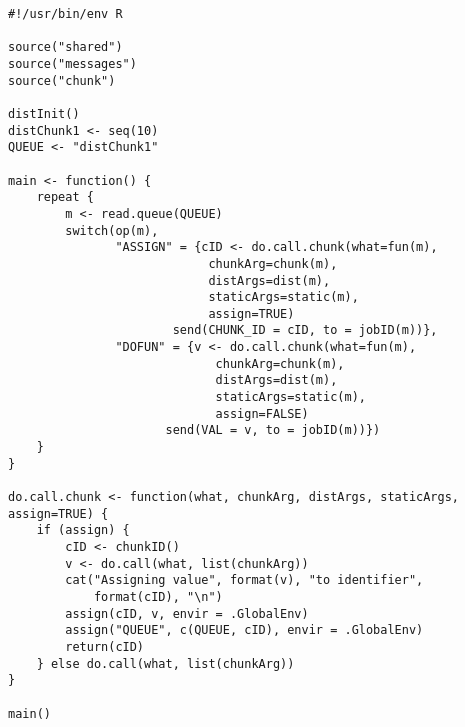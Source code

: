 \hypertarget{lst:wo-ass-server}{%
\label{lst:wo-ass-server}}%
\begin{verbatim}
#!/usr/bin/env R

source("shared")
source("messages")
source("chunk")

distInit()
distChunk1 <- seq(10)
QUEUE <- "distChunk1"

main <- function() {
    repeat {
        m <- read.queue(QUEUE)
        switch(op(m),
               "ASSIGN" = {cID <- do.call.chunk(what=fun(m),
                            chunkArg=chunk(m),
                            distArgs=dist(m),
                            staticArgs=static(m),
                            assign=TRUE)
                       send(CHUNK_ID = cID, to = jobID(m))},
               "DOFUN" = {v <- do.call.chunk(what=fun(m),
                             chunkArg=chunk(m),
                             distArgs=dist(m),
                             staticArgs=static(m),
                             assign=FALSE)
                      send(VAL = v, to = jobID(m))})
    }
}

do.call.chunk <- function(what, chunkArg, distArgs, staticArgs, assign=TRUE) {
    if (assign) {
        cID <- chunkID()
        v <- do.call(what, list(chunkArg))
        cat("Assigning value", format(v), "to identifier",
            format(cID), "\n")
        assign(cID, v, envir = .GlobalEnv)
        assign("QUEUE", c(QUEUE, cID), envir = .GlobalEnv)
        return(cID)
    } else do.call(what, list(chunkArg))
}

main()
\end{verbatim}

